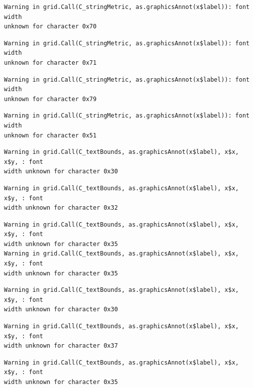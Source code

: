 \documentclass[
  letterpaper,
]{scrbook}
\begin{document}
\begin{verbatim}
Warning in grid.Call(C_stringMetric, as.graphicsAnnot(x$label)): font width
unknown for character 0x70
\end{verbatim}

\begin{verbatim}
Warning in grid.Call(C_stringMetric, as.graphicsAnnot(x$label)): font width
unknown for character 0x71
\end{verbatim}

\begin{verbatim}
Warning in grid.Call(C_stringMetric, as.graphicsAnnot(x$label)): font width
unknown for character 0x79
\end{verbatim}

\begin{verbatim}
Warning in grid.Call(C_stringMetric, as.graphicsAnnot(x$label)): font width
unknown for character 0x51
\end{verbatim}

\begin{verbatim}
Warning in grid.Call(C_textBounds, as.graphicsAnnot(x$label), x$x, x$y, : font
width unknown for character 0x30
\end{verbatim}

\begin{verbatim}
Warning in grid.Call(C_textBounds, as.graphicsAnnot(x$label), x$x, x$y, : font
width unknown for character 0x32
\end{verbatim}

\begin{verbatim}
Warning in grid.Call(C_textBounds, as.graphicsAnnot(x$label), x$x, x$y, : font
width unknown for character 0x35
Warning in grid.Call(C_textBounds, as.graphicsAnnot(x$label), x$x, x$y, : font
width unknown for character 0x35
\end{verbatim}

\begin{verbatim}
Warning in grid.Call(C_textBounds, as.graphicsAnnot(x$label), x$x, x$y, : font
width unknown for character 0x30
\end{verbatim}

\begin{verbatim}
Warning in grid.Call(C_textBounds, as.graphicsAnnot(x$label), x$x, x$y, : font
width unknown for character 0x37
\end{verbatim}

\begin{verbatim}
Warning in grid.Call(C_textBounds, as.graphicsAnnot(x$label), x$x, x$y, : font
width unknown for character 0x35
\end{verbatim}
\end{document}

